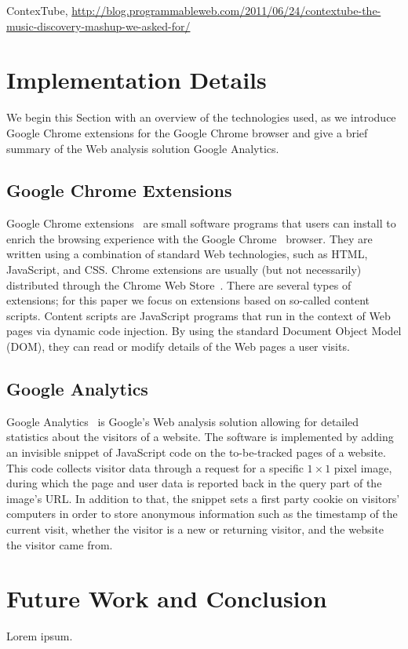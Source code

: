 \documentclass[runningheads,a4paper]{llncs}
\begin{document}
ContexTube, \url{http://blog.programmableweb.com/2011/06/24/contextube-the-music-discovery-mashup-we-asked-for/}

\section{Implementation Details} \label{sec:implementation}
We begin this Section with an overview of the technologies used, as we introduce Google Chrome extensions for the Google Chrome browser and give a brief summary of the Web analysis solution Google Analytics.

\subsection{Google Chrome Extensions}
Google Chrome extensions~\cite{chromeextensions} are small software programs that users can install to enrich the browsing experience with the Google Chrome~\cite{chrome} browser. They are written using a combination of standard Web technologies, such as HTML, JavaScript, and CSS. Chrome extensions are usually (but not necessarily) distributed through the Chrome Web Store~\cite{chromewebstore}. There are several types of extensions; for this paper we focus on extensions based on so-called content scripts. Content scripts are JavaScript programs that run in the context of Web pages via dynamic code injection. By using the standard Document Object Model (DOM), they can read or modify details of the Web pages a user visits.

\subsection{Google Analytics}
Google Analytics~\cite{googleanalytics} is Google's Web analysis solution allowing for detailed statistics about the visitors of a website. The software is implemented by adding an invisible snippet of JavaScript code on the to-be-tracked pages of a website. This code collects visitor data through a request for a specific $1 \times 1$ pixel image, during which the page and user data is reported back in the query part of the image's URL. In addition to that, the snippet sets a first party cookie on visitors' computers in order to store anonymous information such as the timestamp of the current visit, whether the visitor is a new or returning visitor, and the website the visitor came from.

\section{Future Work and Conclusion} \label{sec:future-work-conclusion}
Lorem ipsum.

\renewcommand{\ttdefault}{cmvtt}
\renewcommand\UrlFont\tt



\end{document}
